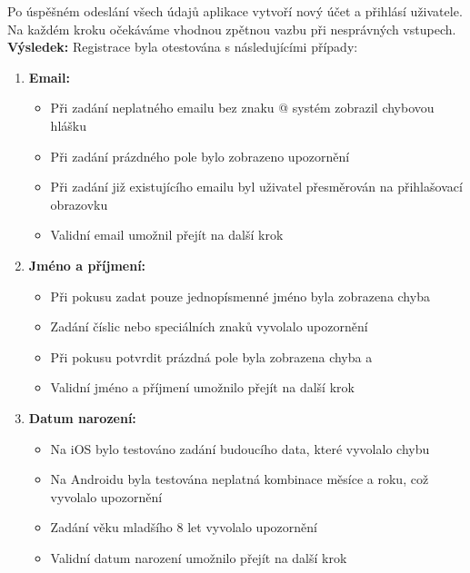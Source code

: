 \documentclass[czech, bp, kiv, he, iso690numb, pdf]{fasthesis}
\begin{document}
    Po úspěšném odeslání všech údajů aplikace vytvoří nový účet a přihlásí uživatele. Na každém kroku očekáváme vhodnou zpětnou vazbu při nesprávných vstupech.\\

    \noindent \textbf{Výsledek:}
    Registrace byla otestována s následujícími případy:

    \begin{enumerate}
        \item \textbf{Email:}
        \begin{itemize}
            \item Při zadání neplatného emailu  bez znaku @ systém zobrazil chybovou hlášku 
            \item Při zadání prázdného pole bylo zobrazeno upozornění 
            \item Při zadání již existujícího emailu byl uživatel přesměrován na přihlašovací obrazovku
            \item Validní email umožnil přejít na další krok
        \end{itemize}

        \item \textbf{Jméno a příjmení:}
        \begin{itemize}
            \item Při pokusu zadat pouze jednopísmenné jméno byla zobrazena chyba 
            \item Zadání číslic nebo speciálních znaků vyvolalo upozornění 
            \item Při pokusu potvrdit prázdná pole byla zobrazena chyba  a 
            \item Validní jméno a příjmení umožnilo přejít na další krok
        \end{itemize}

        \item \textbf{Datum narození:}
        \begin{itemize}
            \item Na iOS bylo testováno zadání budoucího data, které vyvolalo chybu 
            \item Na Androidu byla testována neplatná kombinace měsíce a roku, což vyvolalo upozornění 
            \item Zadání věku mladšího 8 let vyvolalo upozornění 
            \item Validní datum narození umožnilo přejít na další krok
        \end{itemize}


\end{enumerate}
\end{document}
